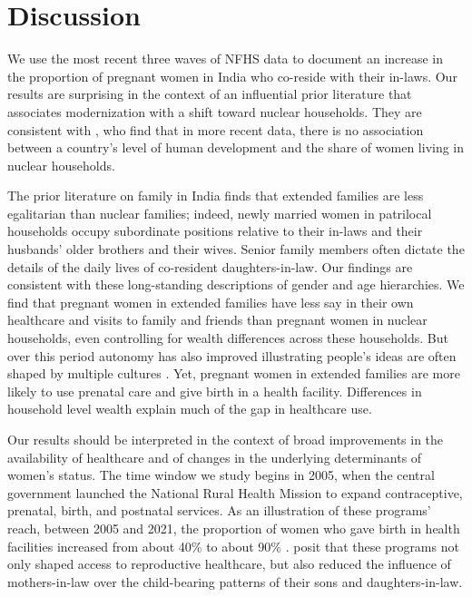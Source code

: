 \documentclass[12pt]{article}
\begin{document}
\section*{Discussion}

We use the most recent three waves of NFHS data to document an increase in the proportion of pregnant women in India who co-reside with their in-laws. Our results are surprising in the context of an influential prior literature that associates modernization with a shift toward nuclear households.  They are consistent with \cite{pesando2018global}, who find that in more recent data, there is no association between a country's level of human development and the share of women living in nuclear households.

The prior literature on family in India finds that extended families are less egalitarian than nuclear families; indeed, newly married women in patrilocal households occupy subordinate positions relative to their in-laws and their husbands' older brothers and their wives. Senior family members often dictate the details of the daily lives of co-resident daughters-in-law. Our findings are consistent with these long-standing descriptions of gender and age hierarchies.  We find that pregnant women in extended families have less say in their own healthcare and visits to family and friends than pregnant women in nuclear households, even controlling for wealth differences across these households. But over this period autonomy has also improved illustrating people's ideas are often shaped by multiple cultures \citep{allendorf2013schemas}.  Yet, pregnant women in extended families are more likely to use prenatal care and give birth in a health facility.  Differences in household level wealth explain much of the gap in healthcare use. 

Our results should be interpreted in the context of broad improvements in the availability of healthcare and of changes in the underlying determinants of women's status.  The time window we study begins in 2005, when the central government launched the National Rural Health Mission to expand contraceptive, prenatal, birth, and postnatal services.  As an illustration of these programs' reach, between 2005 and 2021, the proportion of women who gave birth in health facilities increased from about 40\% to about 90\% \citep{IIPS2007NFHS3,IIPS2021NFHS5}.  \cite{char2010influence} posit that these programs not only shaped access to reproductive healthcare, but also reduced the influence of mothers-in-law over the child-bearing patterns of their sons and daughters-in-law.  
\end{document}

